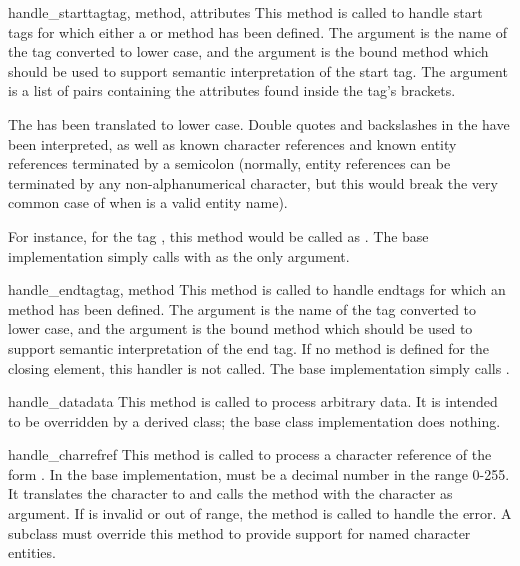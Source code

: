 \begin{methoddesc}{handle_starttag}{tag, method, attributes}
This method is called to handle start tags for which either a
 or  method has been
defined.  The  argument is the name of the tag converted to
lower case, and the  argument is the bound method which
should be used to support semantic interpretation of the start tag.
The  argument is a list of  pairs containing the attributes found inside the tag's
\code{<>} brackets.

The  has been translated to lower case.
Double quotes and backslashes in the  have been interpreted,
as well as known character references and known entity references
terminated by a semicolon (normally, entity references can be terminated
by any non-alphanumerical character, but this would break the very
common case of  when 
is a valid entity name).

For instance, for the tag , this
method would be called as .  The base implementation simply calls
 with  as the only argument.
\end{methoddesc}

\begin{methoddesc}{handle_endtag}{tag, method}
This method is called to handle endtags for which an
 method has been defined.  The
 argument is the name of the tag converted to lower case, and
the  argument is the bound method which should be used to
support semantic interpretation of the end tag.  If no
 method is defined for the closing element,
this handler is not called.  The base implementation simply calls
.
\end{methoddesc}

\begin{methoddesc}{handle_data}{data}
This method is called to process arbitrary data.  It is intended to be
overridden by a derived class; the base class implementation does
nothing.
\end{methoddesc}

\begin{methoddesc}{handle_charref}{ref}
This method is called to process a character reference of the form
.  In the base implementation,  must
be a decimal number in the
range 0-255.  It translates the character to \ASCII{} and calls the
method  with the character as argument.  If
 is invalid or out of range, the method
 is called to handle the error.  A
subclass must override this method to provide support for named
character entities.
\end{methoddesc}

